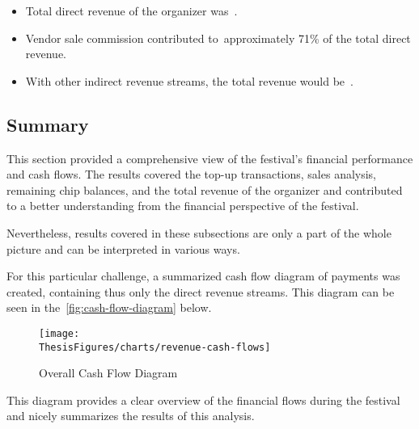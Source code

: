 \begin{keytakeaways}
	\begin{itemize}
		\item Total direct revenue of the organizer was~.
		\item Vendor sale commission contributed to~approximately 71\% of the total direct revenue.
		\item With other indirect revenue streams, the total revenue would be~.
	\end{itemize}
\end{keytakeaways}


\subsection{Summary}
\label{subsec:analysis-cashflow-summary}

This section provided a comprehensive view of the festival's financial performance and cash flows.
The results covered the top-up transactions, sales analysis, remaining chip balances, and the total revenue of the organizer and contributed to a better understanding from the financial perspective of the festival.

Nevertheless, results covered in these subsections are only a part of the whole picture and can be interpreted in various ways.

For this particular challenge, a summarized cash flow diagram of payments was created, containing thus only the direct revenue streams.
This diagram can be seen in the~\autoref{fig:cash-flow-diagram} below.

\begin{figure}[H]
	\centering
	\texttt{[image: \\ThesisFigures/charts/revenue-cash-flows]}
	\caption{Overall Cash Flow Diagram}
	\label{fig:cash-flow-diagram}
	\source
\end{figure}

This diagram provides a clear overview of the financial flows during the festival and nicely summarizes the results of this analysis.

